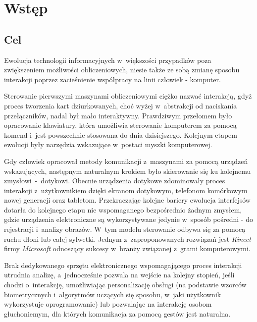\chapter{Wstęp}\label{Chapter_Wstep}

  \section{Cel}\label{Section_Aim}

    Ewolucja technologii informacyjnych w~większości przypadków poza zwiększeniem możliwości obliczeniowych, niesie także ze sobą zmianę sposobu interakcji poprzez zacieśnienie współpracy na linii człowiek - komputer.

    Sterowanie pierwszymi maszynami obliczeniowymi ciężko nazwać interakcją, gdyż proces tworzenia kart dziurkowanych, choć wyżej w~abstrakcji od naciskania przełączników, nadal był mało interaktywny. Prawdziwym przełomem było opracowanie klawiatury, która umożliwia sterowanie komputerem za pomocą komend i~jest powszechnie stosowana do dnia dzisiejszego. Kolejnym etapem ewolucji były narzędzia wskazujące w~postaci myszki komputerowej.

    Gdy człowiek opracował metody komunikacji z~maszynami za pomocą urządzeń wskazujących, następnym naturalnym krokiem było skierowanie się ku kolejnemu zmysłowi~-~dotykowi. Obecnie urządzenia dotykowe zdominowały proces interakcji z~użytkownikiem dzięki ekranom dotykowym, telefonom komórkowym nowej generacji oraz tabletom. Przekraczając kolejne bariery ewolucja interfejsów dotarła do kolejnego etapu nie wspomaganego bezpośrednio żadnym zmysłem, gdzie urządzenia elektroniczne są wykorzystywane jedynie w~sposób pośredni - do rejestracji i~analizy obrazów. W~tym modelu sterowanie odbywa się za pomocą ruchu dłoni lub całej sylwetki. Jednym z~zaproponowanych rozwiązań jest \textit{Kinect} firmy \textit{Microsoft} odnoszący sukcesy w~branży związanej z~grami komputerowymi.

    Brak dedykowanego sprzętu elektronicznego wspomagającego proces interakcji utrudnia analizę, a~jednocześnie pozwala na wejście na kolejny stopień, jeśli chodzi o~interakcję, umożliwiając personalizację obsługi (na podstawie wzorców biometrycznych i~algorytmów uczących się sposobu, w~jaki użytkownik wykorzystuje oprogramowanie) lub pozwalając na interakcję osobom głuchoniemym, dla których komunikacja za pomocą gestów jest naturalna.

